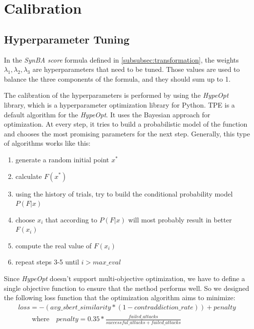 \section{Calibration}\label{sec:calibration}

\subsection{Hyperparameter Tuning}\label{subsec:hyperparameter-tuning}

In the \emph{SynBA score} formula defined in \ref{subsubsec:transformation}, the weights $\lambda_1, \lambda_2, \lambda_3$ are hyperparameters that need to be tuned. 
Those values are used to balance the three components of the formula, and they should sum up to 1.

The calibration of the hyperparameters is performed by using the \emph{HypeOpt} \cite{conf/icml/BergstraYC13} library, which is a hyperparameter optimization library for Python. 
TPE \cite{bergstra2011algorithms} is a default algorithm for the \emph{HypeOpt}. It uses the Bayesian approach for optimization. At every step, it tries to build a probabilistic model of the function and chooses the most promising parameters for the next step. Generally, this type of algorithms works like this:
\begin{enumerate}
    \item generate a random initial point  $x^*$ 
    \item calculate  $F(x^*)$
    \item using the history of trials, try to build the conditional probability model  $P(F|x)$
    \item choose  $x_i$  that according to  $P(F|x)$  will most probably result in better  $F(x_i)$
    \item compute the real value of  $F(x_i)$ 
    \item repeat steps 3-5 until $i > max\_eval$
\end{enumerate}

Since \emph{HypeOpt} doesn't support multi-objective optimization, we have to define a single objective function to ensure that the method performs well.
So we designed the following loss function that the optimization algorithm aims to minimize:
\begin{multline}
    loss = - ( avg\_sbert\_similarity * (1 - contraddiction\_rate) ) + penalty \\
    \qquad \text{where} \quad penalty = 0.35 *  \frac{failed\_attacks}{successful\_attacks + failed\_attacks}\\
\end{multline}

